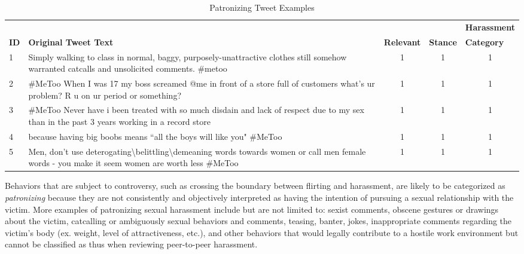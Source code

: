 \begin{table}[H]
    \centering
    \caption{Patronizing Tweet Examples}
    \begin{tabular}{m{1cm} m{8cm} m{1.5cm} m{1.1cm} m{2.1cm}}
        \toprule
        & {} & {} & {} & {\textbf{Harassment}} \\
        \rowcolor{White}\textbf{ID} & {\textbf{Original Tweet Text}} & {\textbf{Relevant}} & {\textbf{Stance}} & {\textbf{Category}} \\
                \midrule
        1 & {Simply walking to class in normal, baggy, purposely-unattractive clothes still somehow warranted catcalls and unsolicited comments. \#metoo} & \multicolumn{1}{c}{1} & \multicolumn{1}{c}{1} & \multicolumn{1}{c}{1}\\
        2 & {\#MeToo When I was 17 my boss screamed @me in front of a store full of customers what's ur problem? R u on ur period or something?} & \multicolumn{1}{c}{1} & \multicolumn{1}{c}{1} & \multicolumn{1}{c}{1}\\
        3 & {\#MeToo Never have i been treated with so much disdain and lack of respect due to my sex than in the past 3 years working in a record store} & \multicolumn{1}{c}{1} & \multicolumn{1}{c}{1} & \multicolumn{1}{c}{1}\\
        4 & {because having big boobs means ``all the boys will like you" \#MeToo} & \multicolumn{1}{c}{1} & \multicolumn{1}{c}{1} & \multicolumn{1}{c}{1}\\
        5 & {Men, don't use deterogating\textbackslash{}belittling\textbackslash{}demeaning words towards women or call men female words - you make it seem women are worth less \#MeToo} & \multicolumn{1}{c}{1} & \multicolumn{1}{c}{1} & \multicolumn{1}{c}{1}\\
        \bottomrule
    \end{tabular}
\end{table}

Behaviors that are subject to controversy, such as crossing the boundary between flirting and harassment, are likely to be categorized as \textit{patronizing} because they are not consistently and objectively interpreted as having the intention of pursuing a sexual relationship with the victim. More examples of patronizing sexual harassment include but are not limited to: sexist comments, obscene gestures or drawings about the victim, catcalling or ambiguously sexual behaviors and comments, teasing, banter, jokes, inappropriate comments regarding the victim's body (ex. weight, level of attractiveness, etc.), and other behaviors that would legally contribute to a hostile work environment but cannot be classified as thus when reviewing peer-to-peer harassment.


